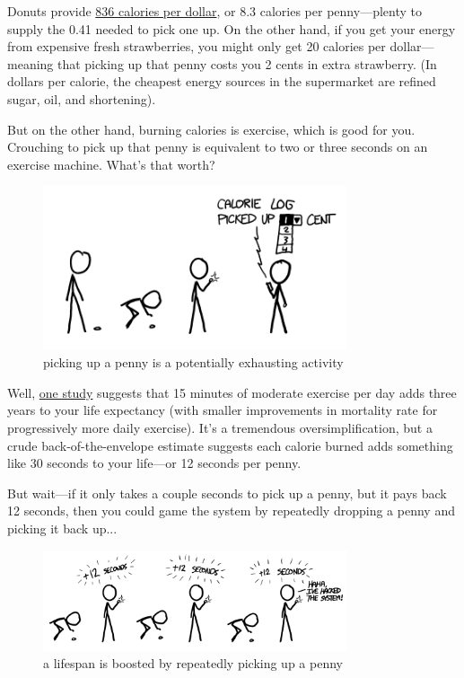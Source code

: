 {Donuts provide \href{http://online.wsj.com/article/SB10001424052702304898704577482822982322972.html}{836 calories per dollar}, or 8.3 calories per penny—plenty to supply the 0.41 needed to pick one up. On the other hand, if you get your energy from expensive fresh strawberries, you might only get 20 calories per dollar—meaning that picking up that penny costs you 2 cents in extra strawberry. (In dollars per calorie, the cheapest energy sources in the supermarket are refined sugar, oil, and shortening).}

{But on the other hand, burning calories is exercise, which is good for you. Crouching to pick up that penny is equivalent to two or three seconds on an exercise machine. What’s that worth?}

\begin{figure}[!htbp]
\centering
\includegraphics[scale=0.5, max width=0.8\textwidth]{imgs/a/22/pennies_fitocracy.png}
\caption{picking up a penny is a potentially exhausting activity}
\end{figure}

{Well, \href{http://www.thelancet.com/journals/lancet/article/PIIS0140-6736(11)60749-6/abstract}{one study} suggests that 15 minutes of moderate exercise per day adds three years to your life expectancy (with smaller improvements in mortality rate for progressively more daily exercise). It’s a tremendous oversimplification, but a crude back-of-the-envelope estimate suggests each calorie burned adds something like 30 seconds to your life—or 12 seconds per penny.}

{But wait—if it only takes a couple seconds to pick up a penny, but it pays back 12 seconds, then you could game the system by repeatedly dropping a penny and picking it back up...}

\begin{figure}[!htbp]
\centering
\includegraphics[scale=0.5, max width=0.8\textwidth]{imgs/a/22/pennies_hack.png}
\caption{a lifespan is boosted by repeatedly picking up a penny}
\end{figure}

